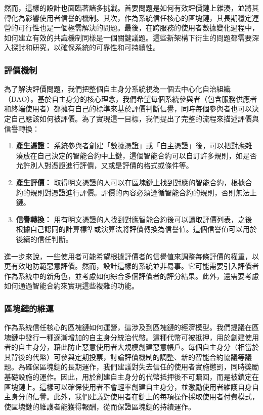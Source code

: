 然而，這樣的設計也面臨著諸多挑戰。首要問題是如何有效評價鏈上雜湊，並將其轉化為影響使用者信譽的機制。其次，作為系統信任核心的區塊鏈，其長期穩定運營的可行性也是一個極需解決的問題。最後，在跨服務的使用者數據變化過程中，如何建立有效的共識機制同樣是一個關鍵議題。這些新架構下衍生的問題都需要深入探討和研究，以確保系統的可靠性和可持續性。
\subsubsection{評價機制}
為了解決評價問題，我們把整個自主身分系統視為一個去中心化自治組織（DAO）。基於自主身分的核心理念，我們希望每個系統參與者（包含服務供應者和終端使用者）都擁有自己的標準來基於評價判斷信譽，同時每個參與者也可以決定自己應該如何被評價。為了實現這一目標，我們提出了完整的流程來描述評價與信譽轉換：
\begin{enumerate}
  \item \textbf{產生憑證：} 系統參與者創建「數據憑證」或「自主憑證」後，可以把對應雜湊放在自己決定的智能合約中上鏈，這個智能合約可以自訂許多規則，如是否允許別人對憑證進行評價，又或是評價的格式或條件等。
  \item \textbf{產生評價：} 取得明文憑證的人可以在區塊鏈上找到對應的智能合約，根據合約的規則對憑證進行評價。評價的內容必須遵循智能合約的規則，否則無法上鏈。
  \item \textbf{信譽轉換：} 用有明文憑證的人找到對應智能合約後可以讀取評價列表，之後根據自己認同的計算標準或演算法將評價轉換為信譽值。這個信譽值可以用於後續的信任判斷。
\end{enumerate}
進一步來說，一些使用者可能希望根據評價者的信譽值來調整每條評價的權重，以更有效地防範惡意評價。然而，設計這樣的系統並非易事。它可能需要引入評價者作為系統中的新角色，並考慮如何綜合多個評價者的評分結果\cite{josang2006exploring}。此外，還需要考慮如何通過智能合約來實現這些複雜的功能。
\subsubsection{區塊鏈的維運}
作為系統信任核心的區塊鏈如何運營，這涉及到區塊鏈的經濟模型。我們提議在區塊鏈中發行一種逐漸增加的自主身分統治代幣。這種代幣可被抵押，用於創建使用者的自主身分，藉此防止惡意使用者大規模創建惡意帳戶。每個自主身分（相當於其背後的代幣）可參與定期投票，討論評價機制的調整、新的智能合約協議等議題。為確保區塊鏈的長期運作，我們建議對失去信任的使用者實施懲罰，同時獎勵基礎設施的運作。因此，用於創建自主身分的代幣抵押後不可贖回，而是被鎖定在區塊鏈上。這樣可以確保使用者不會輕率創建自主身分，並激勵使用者維護自身自主身分的信譽。此外，我們建議對使用者在鏈上的每項操作採取使用者付費模式，使區塊鏈的維護者能獲得報酬，從而保證區塊鏈的持續運作。
